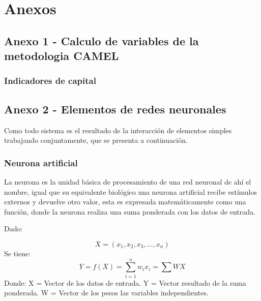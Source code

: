 \documentclass[
  12pt,
]{article}
\begin{document}
\newpage

\hypertarget{anexos}{%
\section{Anexos}\label{anexos}}

\hypertarget{anexo-1---calculo-de-variables-de-la-metodologia-camel}{%
\subsection{Anexo 1 - Calculo de variables de la metodologia
CAMEL}\label{anexo-1---calculo-de-variables-de-la-metodologia-camel}}

\hypertarget{indicadores-de-capital}{%
\subsubsection{Indicadores de capital}\label{indicadores-de-capital}}

\newpage

\hypertarget{anexo-2---elementos-de-redes-neuronales}{%
\subsection{Anexo 2 - Elementos de redes
neuronales}\label{anexo-2---elementos-de-redes-neuronales}}

Como todo sistema es el resultado de la interacción de elementos simples
trabajando conjuntamente, que se presenta a continuación.

\hypertarget{neurona-artificial}{%
\subsubsection{Neurona artificial}\label{neurona-artificial}}

La neurona es la unidad básica de procesamiento de una red neuronal de
ahí el nombre, igual que su equivalente biológico una neurona artificial
recibe estímulos externos y devuelve otro valor, esta es expresada
matemáticamente como una función, donde la neurona realiza una suma
ponderada con los datos de entrada.

Dado:

\[ X = \left( x_{1},x_{2},x_{3},...,x_{n} \right) \] Se tiene:
\[ Y = f(X) = \sum_{i=1}^{n}{w_{i}x_{i}}  = \sum{WX}  \] Donde: \newline
X = Vector de los datos de entrada. \newline Y = Vector resultado de la
suma ponderada. \newline W = Vector de los pesos las variables
independientes.
\end{document}
